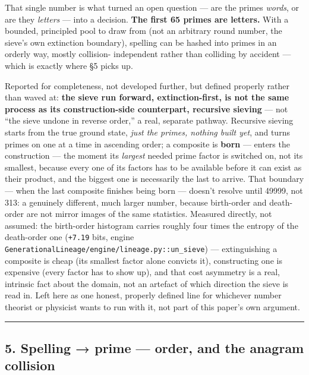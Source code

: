 \documentclass[
  10pt,
]{article}
\begin{document}
That single number is what turned an open question --- are the primes
\emph{words}, or are they \emph{letters} --- into a decision.
\textbf{The first 65 primes are letters.} With a bounded, principled
pool to draw from (not an arbitrary round number, the sieve's own
extinction boundary), spelling can be hashed into primes in an orderly
way, mostly collision- independent rather than colliding by accident ---
which is exactly where §5 picks up.

Reported for completeness, not developed further, but defined properly
rather than waved at: \textbf{the sieve run forward, extinction-first,
is not the same process as its construction-side counterpart, recursive
sieving} --- not ``the sieve undone in reverse order,'' a real, separate
pathway. Recursive sieving starts from the true ground state, \emph{just
the primes, nothing built yet}, and turns primes on one at a time in
ascending order; a composite is \textbf{born} --- enters the
construction --- the moment its \emph{largest} needed prime factor is
switched on, not its smallest, because every one of its factors has to
be available before it can exist as their product, and the biggest one
is necessarily the last to arrive. That boundary --- when the last
composite finishes being born --- doesn't resolve until 49999, not 313:
a genuinely different, much larger number, because birth-order and
death-order are not mirror images of the same statistics. Measured
directly, not assumed: the birth-order histogram carries roughly four
times the entropy of the death-order one (\texttt{+7.19} bits, engine
\texttt{GenerationalLineage/engine/lineage.py::un\_sieve}) ---
extinguishing a composite is cheap (its smallest factor alone convicts
it), constructing one is expensive (every factor has to show up), and
that cost asymmetry is a real, intrinsic fact about the domain, not an
artefact of which direction the sieve is read in. Left here as one
honest, properly defined line for whichever number theorist or physicist
wants to run with it, not part of this paper's own argument.

\begin{center}\rule{0.5\linewidth}{0.5pt}\end{center}

\hypertarget{spelling-prime-order-and-the-anagram-collision}{%
\subsection{5. Spelling → prime --- order, and the anagram
collision}\label{spelling-prime-order-and-the-anagram-collision}}
\end{document}
